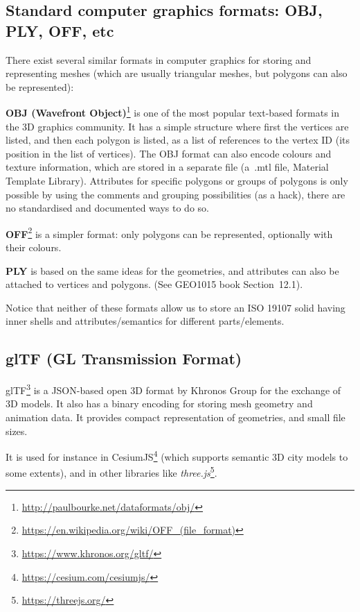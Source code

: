 \subsection{Standard computer graphics formats: OBJ, PLY, OFF, etc}

There exist several similar formats in computer graphics for storing and representing meshes (which are usually triangular meshes, but polygons can also be represented):

\textbf{OBJ (Wavefront Object)}\footnote{\url{http://paulbourke.net/dataformats/obj/}} is one of the most popular text-based formats in the 3D graphics community.
It has a simple structure where first the vertices are listed, and then each polygon is listed, as a list of references to the vertex ID (its position in the list of vertices).
The OBJ format can also encode colours and texture information, which are stored in a separate file (a~.mtl file, Material Template Library).
Attributes for specific polygons or groups of polygons is only possible by using the comments and grouping possibilities (as a hack), there are no standardised and documented ways to do so.

\textbf{OFF}\footnote{\url{https://en.wikipedia.org/wiki/OFF_(file_format)}} is a simpler format: only polygons can be represented, optionally with their colours.

\textbf{PLY} is based on the same ideas for the geometries, and attributes can also be attached to vertices and polygons. (See GEO1015 book Section~12.1).

Notice that neither of these formats allow us to store an ISO 19107 solid having inner shells and attributes/semantics for different parts/elements.


\subsection{glTF (GL Transmission Format)}
glTF\footnote{\url{https://www.khronos.org/gltf/}} is a JSON-based open 3D format by Khronos Group for the exchange of 3D models.
It also has a binary encoding for storing mesh geometry and animation data.
It provides compact representation of geometries, and small file sizes.

It is used for instance in CesiumJS\footnote{\url{https://cesium.com/cesiumjs/}} (which supports semantic 3D city models to some extents), and in other libraries like \emph{three.js}\footnote{\url{https://threejs.org/}}.



